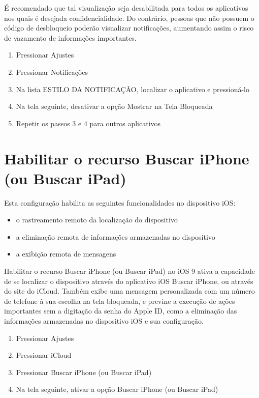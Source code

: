 \'E recomendado que tal visualiza\c c\~ao seja desabilitada para todos os aplicativos nos quais \'e desejada confidencialidade. Do contr\'ario, pessoas que n\~ao possuem o c\'odigo de desbloqueio poder\~ao visualizar notifica\c c\~oes, aumentando assim o risco de vazamento de informa\c c\~oes importantes.

\begin{enumerate}
\item Pressionar Ajustes
\item Pressionar Notifica\c c\~oes
\item Na lista ESTILO DA NOTIFICA\c C\~AO, localizar o aplicativo e pression\'a-lo
\item Na tela seguinte, desativar a op\c c\~ao Mostrar na Tela Bloqueada
\item Repetir os passos 3 e 4 para outros aplicativos  
\end{enumerate}

\section{Habilitar o recurso Buscar iPhone (ou Buscar iPad)}

Esta configura\c c\~ao habilita as seguintes funcionalidades no dispositivo iOS:

\begin{itemize}
\item o rastreamento remoto da localiza\c c\~ao do dispositivo
\item a elimina\c c\~ao remota de informa\c c\~oes armazenadas no dispositivo
\item a exibi\c c\~ao remota de mensagens
\end{itemize}

Habilitar o recurso Buscar iPhone (ou Buscar iPad) no iOS 9 ativa a capacidade de se localizar o dispositivo atrav\'es do aplicativo iOS Buscar iPhone, ou atrav\'es do site do iCloud. Tamb\'em exibe uma mensagem personalizada com um n\'umero de telefone \`a sua escolha na tela bloqueada, e previne a execu\c c\~ao de a\c c\~oes importantes sem a digita\c c\~ao da senha do Apple ID, como a elimina\c c\~ao das informa\c c\~oes armazenadas no dispositivo iOS e sua configura\c c\~ao.

\begin{enumerate}
\item Pressionar Ajustes
\item Pressionar iCloud
\item Pressionar Buscar iPhone (ou Buscar iPad)
\item Na tela seguinte, ativar a op\c c\~ao Buscar iPhone (ou Buscar iPad)
\end{enumerate}

